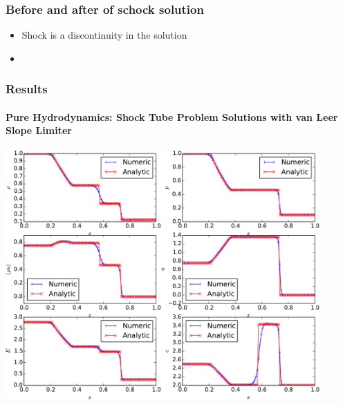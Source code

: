 \documentclass[xcolor=dvipsnames,fontsize=8pt]{beamer}
\newlength{\wideitemsep}
\let\olditem\item
\renewcommand{\item}{\setlength{\itemsep}{\wideitemsep}\olditem}
\begin{document}
\begin{frame}
    \frametitle{Before and after of schock solution}
    \begin{itemize}
        \item Shock is a discontinuity in the solution
        \item 
    \end{itemize}

\end{frame}

\begin{frame}
\frametitle{Results}
\framesubtitle{Pure Hydrodynamics: Shock Tube Problem Solutions with van Leer
  Slope Limiter}

\begin{center}
\includegraphics[width=0.9\textwidth]{./figures/shock_tube.pdf}
\end{center}
\end{frame}
\end{document}
